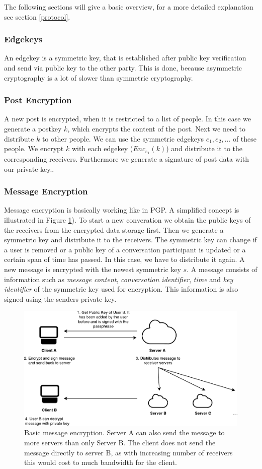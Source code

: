 \documentclass{scrartcl}
\begin{document}
The following sections will give a basic overview, for a more detailed explanation see section \ref{protocol}.
 \subsubsection{Edgekeys}
 An edgekey is a symmetric key, that is established after public key verification and send via public key to the other party. This is done, because asymmetric cryptography is a lot of slower than symmetric cryptography.
 \subsubsection{Post Encryption}
A new post is encrypted, when it is restricted to a list of people. 
In this case we generate a postkey $k$, which encrypts the content of the post. Next we need to distribute $k$ to other people. We can use the symmetric edgekeys $e_1, e_2, ...$ of these people. We encrypt $k$ with each edgekey ($Enc_{e_1} (k)$) and distribute it to the corresponding receivers. Furthermore we generate a signature of post data with our private key..
 \subsubsection{Message Encryption}
 
  Message encryption is basically working like in PGP. A simplified concept is illustrated in Figure \ref{fig2}). 
To start a new converation we obtain the public keys of the receivers from the encrypted data storage first. Then we generate a symmetric key and distribute it to the receivers. The symmetric key can change if a user is removed or a public key of a conversation participant is updated or a certain span of time has passed. In this case, we have to distribute it again. A new message is encrypted with the newest symmetric key $s$.
A message consists of information such as \textit{message content}, \textit{conversation identifier}, \textit{time} and \textit{key identifier} of the symmetric key used for encryption. This information is also signed using the senders private key.

 \begin{figure}[ht]
	\centering
  \includegraphics[width=120mm]{pubkey.pdf}
	\caption{Basic message encryption. Server A can also send the message to more servers than only Server B. The client does not send the message directly to server B, as with increasing number of receivers this would cost to much bandwidth for the client.}
	\label{fig2}
\end{figure}
\end{document}
